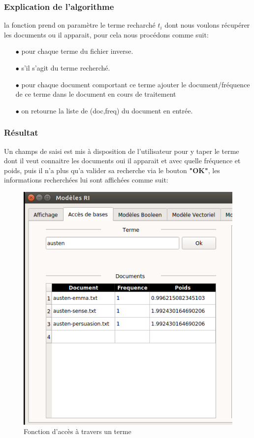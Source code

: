 \documentclass[12pt,a4paper,oneside]{article}
\begin{document}
\subsubsection*{Explication de l'algorithme}
la fonction prend on paramètre le terme recharché $t_i$ dont nous voulons récupérer les documents ou il apparait, pour cela nous procédons comme suit:
\begin{itemize}
	\item[$\bullet$] pour chaque terme du fichier inverse.
	\item[$\bullet$] s'il s'agit du terme recherché.
	\item[$\bullet$] pour chaque document comportant ce terme ajouter le document/fréquence de ce terme dans le document en cours de traitement	\item[$\bullet$] on retourne la liste de (doc,freq) du document en entrée.
\end{itemize}

\subsubsection*{Résultat}
Un champs de saisi est mis à disposition de l'utilisateur pour y taper le terme dont il veut connaitre les documents oui il apparait et avec quelle fréquence et poids, puis il n'a plus qu'a valider sa recherche via le bouton \textbf{"OK"}, les informations recherchées lui sont affichées comme suit:

\begin{figure}[H]
	\centering
	\includegraphics[scale=0.48]{images/f2.png}
	\caption{Fonction d'accès à travers un terme}
\end{figure}
\end{document}
